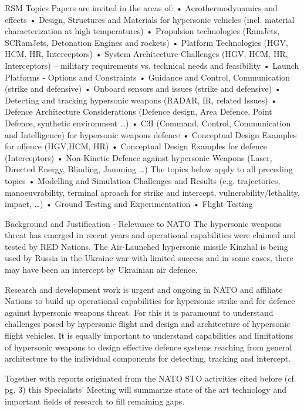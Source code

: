 RSM Topics
Papers are invited in the areas of: 
•	Aerothermodynamics and effects
•	Design, Structures and Materials for hypersonic vehicles (incl. material characterization at high temperatures)
•	Propulsion technologies (RamJets, SCRamJets, Detonation Engines and rockets)
•	Platform Technologies (HGV, HCM, HR, Interceptors)
•	System Architecture Challenges (HGV, HCM, HR, Interceptors) – military requirements vs. technical needs and feasibility
•	Launch Platforms - Options and Constraints
•	Guidance and Control, Communication (strike and defensive)
•	Onboard sensors and issues (strike and defensive)
•	Detecting and tracking hypersonic weapons (RADAR, IR, related Issues)
•	Defence Architecture Considerations (Defence design, Area Defence, Point Defence, synthetic environment …)
•	C3I (Command, Control, Communication and Intelligence) for hypersonic weapons defence
•	Conceptual Design Examples for offence (HGV,HCM, HR)
•	Conceptual Design Examples for defence (Interceptors)
•	Non-Kinetic Defence against hypersonic Weapons (Laser, Directed Energy, Blinding, Jamming …)
The topics below apply to all preceding topics
•	Modelling and Simulation Challenges and Results (e.g. trajectories, manoeuvrability, terminal aproach for strike and intercept, vulnerability/lethality, impact, …)
•	Ground Testing and Experimentation
•	Flight Testing

Background and Justification - Relevance to NATO
The hypersonic weapons threat has emerged in recent years and operational capabilities were claimed and tested by RED Nations. The Air-Launched hypersonic missile Kinzhal is being used by Russia in the Ukraine war with limited success and in some cases, there may have been an intercept by Ukrainian air defence.

Research and development work is urgent and ongoing in NATO and affiliate Nations to build up operational capabilities for hypersonic strike and for defence against hypersonic weapons threat. For this it is paramount to understand challenges posed by hypersonic flight and design and architecture of hypersonic flight vehicles. It is equally important to understand capabilities and limitations of hypersonic weapons to design effective defence systems reaching from general architecture to the individual components for detecting, tracking and intercept.

Together with reports originated from the NATO STO activities cited before (cf. pg. 3) this Specialists’ Meeting will summarize state of the art technology and important fields of research to fill remaining gaps. 


